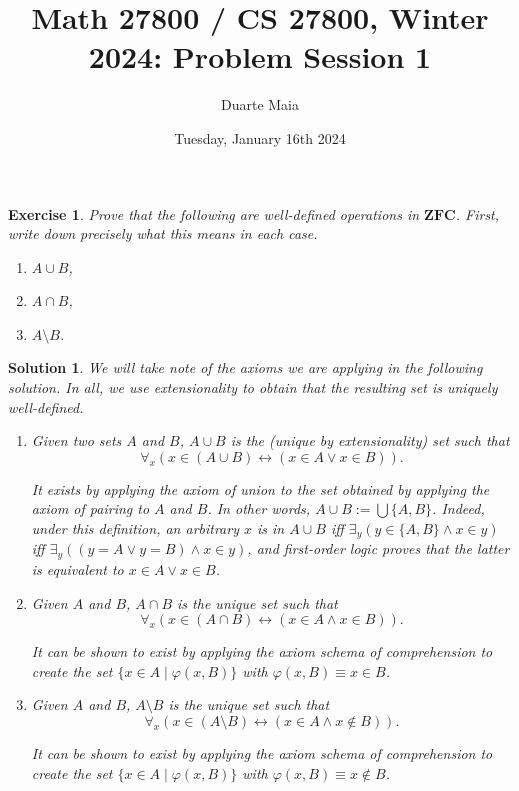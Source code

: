\documentclass{article}
\title{Math 27800 / CS 27800, Winter 2024: Problem Session 1}
\author{Duarte Maia}
\date{Tuesday, January 16th 2024}
\newtheorem{ex}{Exercise}
\theoremstyle{nonumberplain}
\newtheorem{sol}{Solution}
\newcommand{\ZFC}{\mathbf{ZFC}}
\begin{document}
\maketitle

\begin{ex}
Prove that the following are well-defined operations in $\ZFC$. First, write down precisely what this means in each case.
\begin{enumerate}
\item $A \cup B$,
\item $A \cap B$,
\item $A \setminus B$.
\end{enumerate}
\end{ex}

\begin{sol}
We will take note of the axioms we are applying in the following solution. In all, we use extensionality to obtain that the resulting set is uniquely well-defined.

\begin{enumerate}
\item Given two sets $A$ and $B$, $A \cup B$ is the (unique by extensionality) set such that
\begin{equation}
\forall_x (x \in (A \cup B) \leftrightarrow (x \in A \lor x \in B)).
\end{equation}

It exists by applying the axiom of union to the set obtained by applying the axiom of pairing to $A$ and $B$. In other words, $A \cup B := \bigcup\{A,B\}$. Indeed, under this definition, an arbitrary $x$ is in $A \cup B$ iff $\exists_y (y \in \{A,B\} \land x \in y)$ iff $\exists_y ((y = A \lor y = B) \land x \in y)$, and first-order logic proves that the latter is equivalent to $x \in A \lor x \in B$.

\item Given $A$ and $B$, $A \cap B$ is the unique set such that
\begin{equation}
\forall_x (x \in (A \cap B) \leftrightarrow (x \in A \land x \in B)).
\end{equation}

It can be shown to exist by applying the axiom schema of comprehension to create the set $\{x \in A \mid \varphi(x,B) \}$ with $\varphi(x,B) \equiv x \in B$.

\item  Given $A$ and $B$, $A \setminus B$ is the unique set such that
\begin{equation}
\forall_x (x \in (A \setminus B) \leftrightarrow (x \in A \land x \not\in B)).
\end{equation}

It can be shown to exist by applying the axiom schema of comprehension to create the set $\{x \in A \mid \varphi(x,B) \}$ with $\varphi(x,B) \equiv x \not\in B$.
\end{enumerate}
\end{sol}
\end{document}
